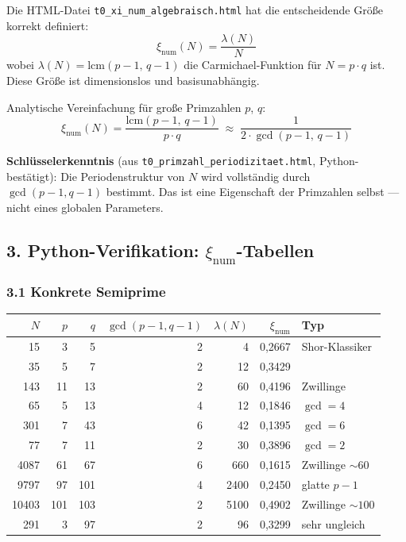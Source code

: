 Die HTML-Datei \texttt{t0\_xi\_num\_algebraisch.html} hat die entscheidende
Größe korrekt definiert:
\[
\xi_\text{num}(N) = \frac{\lambda(N)}{N}
\]
wobei $\lambda(N) = \text{lcm}(p-1,\, q-1)$ die Carmichael-Funktion für
$N = p \cdot q$ ist. Diese Größe ist dimensionslos und basisunabhängig.

Analytische Vereinfachung für große Primzahlen $p$, $q$:
\[
\xi_\text{num}(N) = \frac{\text{lcm}(p-1,\, q-1)}{p \cdot q}
\;\approx\; \frac{1}{2 \cdot \gcd(p-1,\, q-1)}
\]

\begin{mdframed}[style=ok]
\textbf{Schlüsselerkenntnis} (aus \texttt{t0\_primzahl\_periodizitaet.html},
Python-bestätigt): Die Periodenstruktur von $N$ wird vollständig durch
$\gcd(p-1, q-1)$ bestimmt. Das ist eine Eigenschaft der Primzahlen selbst —
nicht eines globalen Parameters.
\end{mdframed}

\subsection*{3. Python-Verifikation: $\xi_\text{num}$-Tabellen}

\subsubsection*{3.1 Konkrete Semiprime}

\begin{center}
\begin{tabular}{rrrrrrl}
\toprule
$N$ & $p$ & $q$ & $\gcd(p{-}1,q{-}1)$ & $\lambda(N)$ & $\xi_\text{num}$ & Typ \\
\midrule
15    & 3   & 5   & 2 & 4    & 0{,}2667 & Shor-Klassiker \\
35    & 5   & 7   & 2 & 12   & 0{,}3429 & \\
143   & 11  & 13  & 2 & 60   & 0{,}4196 & Zwillinge \\
65    & 5   & 13  & 4 & 12   & 0{,}1846 & $\gcd = 4$ \\
301   & 7   & 43  & 6 & 42   & 0{,}1395 & $\gcd = 6$ \\
77    & 7   & 11  & 2 & 30   & 0{,}3896 & $\gcd = 2$ \\
4087  & 61  & 67  & 6 & 660  & 0{,}1615 & Zwillinge ${\sim}60$ \\
9797  & 97  & 101 & 4 & 2400 & 0{,}2450 & glatte $p{-}1$ \\
10403 & 101 & 103 & 2 & 5100 & 0{,}4902 & Zwillinge ${\sim}100$ \\
291   & 3   & 97  & 2 & 96   & 0{,}3299 & sehr ungleich \\
\bottomrule
\end{tabular}
\end{center}

